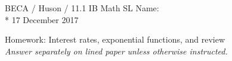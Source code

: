 \noindent BECA / Huson / 11.1 IB Math SL \hspace{2in} Name:\\*
17 December 2017
\begin{center}
{\Large Homework: Interest rates, exponential functions, and review}\\
\textit{Answer separately on lined paper unless otherwise instructed.}
\end{center}

